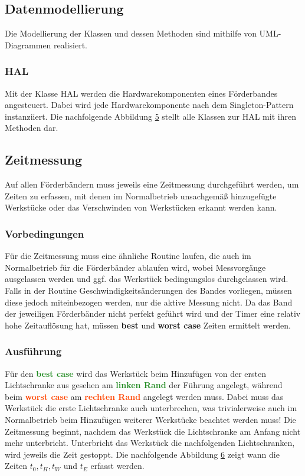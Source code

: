 \documentclass[a4paper, 11pt]{article}
\begin{document}
\newpage

\subsection{Datenmodellierung}
Die Modellierung der Klassen und dessen Methoden sind mithilfe von UML-Diagrammen realisiert.
\subsubsection{HAL}
Mit der Klasse HAL werden die Hardwarekomponenten eines Förderbandes angesteuert. Dabei wird jede Hardwarekomponente nach dem Singleton-Pattern instanziiert. Die nachfolgende Abbildung \hyperref[sec:umlhal]{5} stellt alle Klassen zur HAL mit ihren Methoden dar.
\newpage

\label{sec:umlhal}
\newpage

\subsection{Zeitmessung}
Auf allen Förderbändern muss jeweils eine Zeitmessung durchgeführt werden, um Zeiten zu erfassen, mit denen im Normalbetrieb unsachgemäß hinzugefügte Werkstücke oder das Verschwinden von Werkstücken erkannt werden kann.

\subsubsection{Vorbedingungen}
Für die Zeitmessung muss eine ähnliche Routine laufen, die auch im Normalbetrieb für die Förderbänder ablaufen wird, wobei Messvorgänge ausgelassen werden und ggf. das Werkstück bedingungslos durchgelassen wird. Falls in der Routine Geschwindigkeitsänderungen des Bandes vorliegen, müssen diese jedoch miteinbezogen werden, nur die aktive Messung nicht.
Da das Band der jeweiligen Förderbänder nicht perfekt geführt wird und der Timer eine relativ hohe Zeitauflösung hat, müssen \textbf{best} und \textbf{worst case} Zeiten ermittelt werden. 

\subsubsection{Ausführung}
Für den \textbf{\textcolor{ForestGreen}{best case}} wird das Werkstück beim Hinzufügen von der ersten Lichtschranke aus gesehen am \textbf{\textcolor{ForestGreen}{linken Rand}} der Führung angelegt, während beim \textbf{\textcolor{OrangeRed}{worst case}} am \textbf{\textcolor{OrangeRed}{rechten Rand}} angelegt werden muss. Dabei muss das Werkstück die erste Lichtschranke auch unterbrechen, was trivialerweise auch im Normalbetrieb beim Hinzufügen weiterer Werkstücke beachtet werden muss! Die Zeitmessung beginnt, nachdem das Werkstück die Lichtschranke am Anfang nicht mehr unterbricht. Unterbricht das Werkstück die nachfolgenden Lichtschranken, wird jeweils die Zeit gestoppt. Die nachfolgende Abbildung \hyperref[sec:Messpunkte]{6} zeigt wann die Zeiten $t_0, t_H, t_W$ und $t_E$ erfasst werden.
\end{document}
